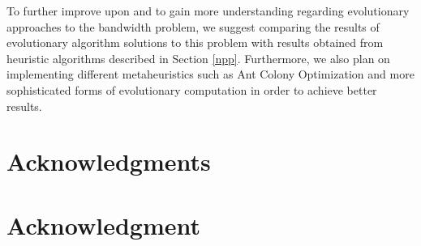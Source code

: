 \documentclass[conference,compsoc]{IEEEtran}
\begin{document}
To further improve upon and to gain more understanding regarding evolutionary approaches to the bandwidth problem, 
we suggest comparing the results of evolutionary algorithm solutions to this problem with results obtained 
from heuristic algorithms described in Section \ref{npp}. Furthermore, we also plan on implementing different metaheuristics
such as Ant Colony Optimization and more sophisticated forms of evolutionary computation in order to achieve better results.      

\ifCLASSOPTIONcompsoc
\section*{Acknowledgments}
\else
  \section*{Acknowledgment}
\fi





\end{document}
